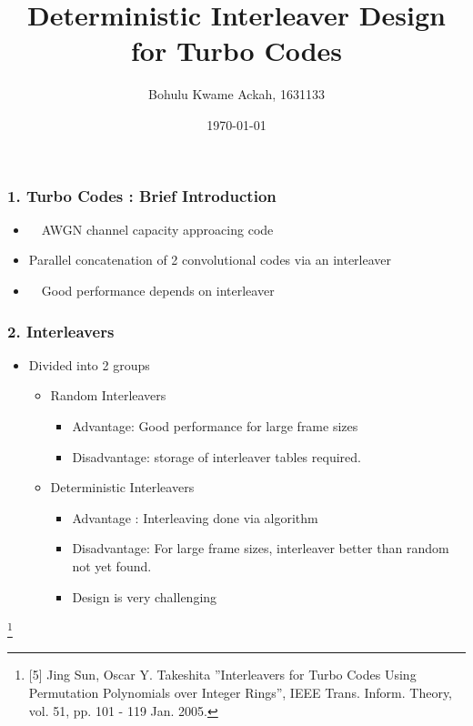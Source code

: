 \documentclass{beamer}  %
\title[Deterministic Interleaver Design for Turbo Codes]{Deterministic Interleaver Design for Turbo Codes}
\author[Bohulu]{ Bohulu Kwame Ackah, 1631133 }
\institute[UEC]{Information Transmission Labroratory}
\date[Week 3]{\today}
\newcommand\blfootnote[1]{%
  \begingroup
  \renewcommand\thefootnote{}\footnote{#1}%
  \addtocounter{footnote}{-1}%
  \endgroup
}
\begin{document}
\frame{\titlepage}


\begin{frame}

	\frametitle{1. Turbo Codes : Brief Introduction}
	\begin{itemize}
\setlength\itemsep{2em}
	\item　AWGN channel capacity approacing code

\item Parallel concatenation of 2 convolutional codes via an interleaver

	\item　Good performance depends on interleaver
	\end{itemize}
\end{frame}

\begin{frame}
\frametitle{2. Interleavers}


\begin{itemize}
\setlength\itemsep{2em} 

\item Divided into 2 groups
\begin{itemize}
\setlength\itemsep{1em}
\item Random Interleavers
\begin{itemize}
\item Advantage: Good performance for large frame sizes

\item Disadvantage: storage of interleaver tables required.
\end{itemize}
\item Deterministic Interleavers
\begin{itemize}
\item Advantage : Interleaving done via algorithm

\item Disadvantage: For large frame sizes, interleaver better than random not yet found.

\item Design is very challenging


\end{itemize}
\end{itemize}
\end{itemize}
\blfootnote {[5] Jing Sun, Oscar Y. Takeshita ''Interleavers for Turbo Codes Using 
Permutation Polynomials over Integer Rings'', IEEE Trans. Inform. Theory, vol. 51, 
pp. 101 - 119  Jan. 2005.}
\end{frame}
\end{document}
